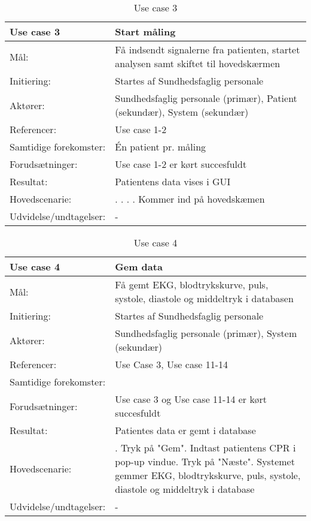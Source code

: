 \begin{table}[h!]
\caption{Use case 3}\label{tab:tabel3}
\begin{tabular}{| l | >{\raggedright\arraybackslash}p{11cm} |}
   \hline
   \textbf{Use case 3} & \textbf{Start måling}\\ \hline
   Mål: & Få indsendt signalerne fra patienten, startet analysen samt skiftet til hovedskærmen \\ \hline
   Initiering: & Startes af Sundhedsfaglig personale\\ \hline
   Aktører:& Sundhedsfaglig personale (primær), Patient (sekundær), System (sekundær)\\ \hline
   Referencer: & Use case 1-2 \\ \hline
   Samtidige forekomster: & Én patient pr. måling \\\hline
   Forudsætninger: & Use case 1-2 er kørt succesfuldt \\ \hline
   Resultat:& Patientens data vises i GUI\\ \hline
   Hovedscenarie:& 
1. \newline
2. \newline
3. \newline
4. Kommer ind på hovedskæmen\\\hline
Udvidelse/undtagelser: & -\\\hline
\end{tabular}
\end{table}

\begin{table}[h!]
\caption{Use case 4}\label{tab:tabel3}
\begin{tabular}{| l | >{\raggedright\arraybackslash}p{11cm} |}
   \hline
   \textbf{Use case 4} & \textbf{Gem data}\\ \hline
   Mål: &  Få gemt EKG, blodtrykskurve, puls, systole, diastole og middeltryk i databasen \\ \hline
   Initiering: & Startes af Sundhedsfaglig personale\\ \hline
   Aktører:& Sundhedsfaglig personale (primær), System (sekundær)\\ \hline
   Referencer: & Use Case 3, Use case 11-14\\ \hline
   Samtidige forekomster: & \\\hline
   Forudsætninger: & Use case 3 og Use case 11-14 er kørt succesfuldt  \\ \hline
   Resultat:& Patientes data er gemt i database\\ \hline
   Hovedscenarie:& 
1. Tryk på "Gem"\newline
2. Indtast patientens CPR i pop-up vindue\newline
3. Tryk på "Næste"\newline
4. Systemet gemmer EKG, blodtrykskurve, puls, systole, diastole og middeltryk i database \\\hline
Udvidelse/undtagelser: & -\\\hline
\end{tabular}
\end{table}

